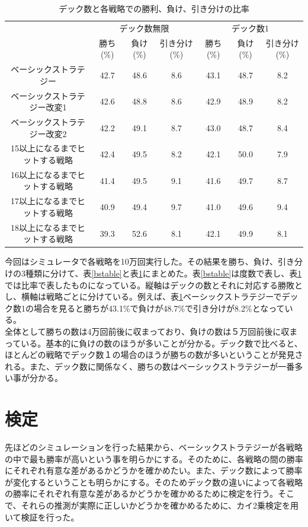 \begin{table}[H]
 \caption{デック数と各戦略での勝利、負け、引き分けの比率\label{ratebstable}}
 \begin{center}
  \begin{tabular}{|c|c|c|c|c|c|c|}
    \hline & \multicolumn{3}{c|}{デック数無限} & \multicolumn{3}{c|}{デック数1} \\
    \cline{2-7} & 勝ち(\%) & 負け(\%) & 引き分け(\%) & 勝ち(\%) & 負け(\%) & 引き分け(\%) \\
    \hline ベーシックストラテジー & 42.7 & 48.6 & 8.6 & 43.1 & 48.7 & 8.2 \\
    \hline ベーシックストラテジー改変1 & 42.6 & 48.8 & 8.6 & 42.9 & 48.9 & 8.2 \\
    \hline ベーシックストラテジー改変2 & 42.2 & 49.1 & 8.7 & 43.0 & 48.7 & 8.4 \\
    \hline 15以上になるまでヒットする戦略 & 42.4 & 49.5 & 8.2 & 42.1 & 50.0 & 7.9 \\
    \hline 16以上になるまでヒットする戦略 & 41.4 & 49.5 & 9.1 & 41.6 & 49.7 & 8.7 \\
    \hline 17以上になるまでヒットする戦略 & 40.9 & 49.4 & 9.7 & 41.0 & 49.6 & 9.4 \\
    \hline 18以上になるまでヒットする戦略 & 39.3 & 52.6 & 8.1 & 42.1 & 49.9 & 8.1 \\
    \hline
  \end{tabular}
 \end{center}
\end{table}
今回はシミュレータで各戦略を10万回実行した。その結果を勝ち、負け、引き分けの3種類に分けて、表\ref{bstable}と表\ref{ratebstable}にまとめた。表\ref{bstable}は度数で表し、表\ref{ratebstable}では比率で表したものになっている。縦軸はデックの数とそれに対応する勝敗とし、横軸は戦略ごとに分けている。例えば、表\ref{ratebstable}ベーシックストラテジーでデック数1の場合を見ると勝ちが43.1\%で負けが48.7\%で引き分けが8.2\%となっている。\\
全体として勝ちの数は4万回前後に収まっており、負けの数は５万回前後に収まっている。基本的に負けの数のほうが多いことが分かる。デック数で比べると、ほとんどの戦略でデック数１の場合のほうが勝ちの数が多いということが発見される。また、デック数に関係なく、勝ちの数はベーシックストラテジーが一番多い事が分かる。

\section{検定}
先ほどのシミュレーションを行った結果から、ベーシックストラテジーが各戦略の中で最も勝率が高いという事を明らかにする。そのために、各戦略の間の勝率にそれぞれ有意な差があるかどうかを確かめたい。また、デック数によって勝率が変化するということも明らかにする。そのためデック数の違いによって各戦略の勝率にそれぞれ有意な差があるかどうかを確かめるために検定を行う。そこで、それらの推測が実際に正しいかどうかを確かめるために、カイ2乗検定を用いて検証を行った。

